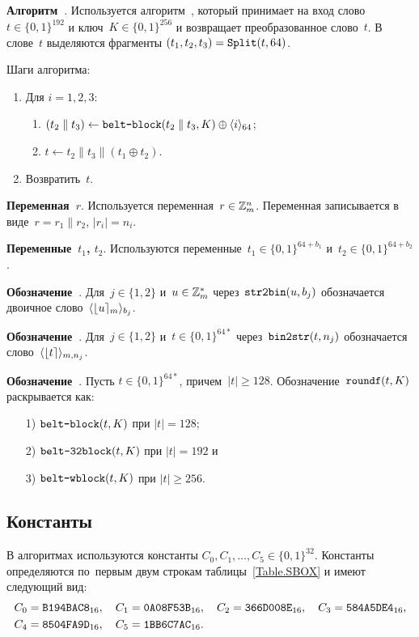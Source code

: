 {\bf Алгоритм~}.
Используется алгоритм~,
который принимает на вход слово~$t\in\{0,1\}^{192}$ и ключ~$K\in\{0,1\}^{256}$
и возвращает преобразованное слово~$t$. В слове~$t$ выделяются 
фрагменты $(t_1,t_2,t_3)=\mathop{\texttt{Split}}\nolimits(t,64)$.

Шаги алгоритма:
\begin{enumerate}
\item
Для $i=1,2,3$:
\begin{enumerate}
\item
$(t_2\parallel t_3)\leftarrow
\texttt{belt-block}(t_2\parallel t_3,K)\oplus \langle i\rangle_{64}$; 
\item
$t\leftarrow t_2\parallel t_3\parallel(t_1\oplus t_2)$.
\end{enumerate}
\item
Возвратить~$t$.
\end{enumerate}

{\bf Переменная~$r$}.
Используется переменная~$r\in\mathbb{Z}_m^n$.
Переменная записывается в виде~$r=r_1\parallel r_2$,
$|r_i|=n_i$.

{\bf Переменные~$t_1$, $t_2$}.
Используются переменные~$t_1\in\{0,1\}^{64+b_1}$ 
и~$t_2\in\{0,1\}^{64+b_2}$.

{\bf Обозначение~}.
Для~$j\in\{1,2\}$ и~$u\in\mathbb{Z}_m^*$ через~$\texttt{str2bin}(u,b_j)$ 
обозначается двоичное слово~$\langle\lfloor u\rceil_m\rangle_{b_j}$.

{\bf Обозначение~}.
Для~$j\in\{1,2\}$ и~$t\in\{0,1\}^{64*}$ через~$\texttt{bin2str}(t,n_j)$ 
обозначается слово~$\langle\lfloor t\rceil\rangle_{m,n_j}$. 

{\bf Обозначение~}.
Пусть $t\in\{0,1\}^{64*}$, причем~$|t|\geq 128$.
Обозначение~$\texttt{roundf}(t,K)$ раскрывается как:
\begin{enumerate}
\item[1)]
$\texttt{belt-block}(t,K)$ при $|t|=128$;
\item[2)]
$\texttt{belt-32block}(t,K)$ при $|t|=192$ и
\item[3)]
$\texttt{belt-wblock}(t,K)$ при $|t|\geq 256$.
\end{enumerate}

\subsection{Константы}\label{FMT.Const}

В алгоритмах используются константы $C_0,C_1,\ldots,C_5\in\{0,1\}^{32}$.
Константы определяются по~первым двум строкам таблицы~\ref{Table.SBOX}
и имеют следующий вид:
\begin{align*}
&
C_0 = \texttt{B194BAC8}_{16},\quad
C_1 = \texttt{0A08F53B}_{16},\quad
C_2 = \texttt{366D008E}_{16},\quad
C_3 = \texttt{584A5DE4}_{16},\\
&
C_4 = \texttt{8504FA9D}_{16},\quad
C_5 = \texttt{1BB6C7AC}_{16}.
\end{align*}

